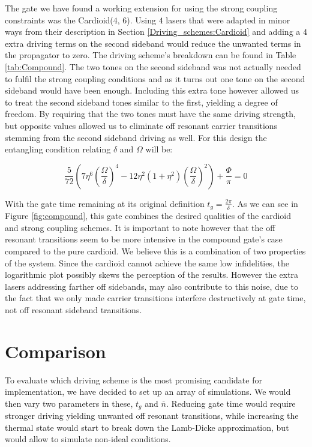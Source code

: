 \documentclass[12pt,twoside]{report}
\begin{document}
The gate we have found a working extension for using the strong coupling constraints was the Cardioid($4$, $6$). Using $4$ lasers that were adapted in minor ways from their description in Section \ref{Driving_schemes:Cardioid} and adding a $4$ extra driving terms on the second sideband would reduce the unwanted terms in the propagator to zero. The driving scheme's breakdown can be found in Table \ref{tab:Compound}. The two tones on the second sideband was not actually needed to fulfil the strong coupling conditions and as it turns out one tone on the second sideband would have been enough. Including this extra tone however allowed us to treat the second sideband tones similar to the first, yielding a degree of freedom. By requiring that the two tones must have the same driving strength, but opposite values allowed us to eliminate off resonant carrier transitions stemming from the second sideband driving as well. For this design the entangling condition relating $\delta$ and $\Omega$ will be:

\begin{equation}
	\frac{5}{72}\left(7\eta^6\left(\frac{\Omega}{\delta}\right)^4-12\eta^2\left(1+\eta^2\right)\left(\frac{\Omega}{\delta}\right)^2\right) + \frac{\Phi}{\pi} = 0
	\label{eq:compound_entangling}
\end{equation}

With the gate time remaining at its original definition $t_g = \frac{2\pi}{\delta}$. As we can see in Figure \ref{fig:compound}, this gate combines the desired qualities of the cardioid and strong coupling schemes. It is important to note however that the off resonant transitions seem to be more intensive in the compound gate's case compared to the pure cardioid. We believe this is a combination of two properties of the system. Since the cardioid cannot achieve the same low infidelities, the logarithmic plot possibly skews the perception of the results. However the extra lasers addressing farther off sidebands, may also contribute to this noise, due to the fact that we only made carrier transitions interfere destructively at gate time, not off resonant sideband transitions.

\section{Comparison}
\label{Driving_schemes:Comparison}

To evaluate which driving scheme is the most promising candidate for implementation, we have decided to set up an array of simulations. We would then vary two parameters in these, $t_g$ and $\overline{n}$. Reducing gate time would require stronger driving yielding unwanted off resonant transitions, while increasing the thermal state would start to break down the Lamb-Dicke approximation, but would allow to simulate non-ideal conditions.
\end{document}

